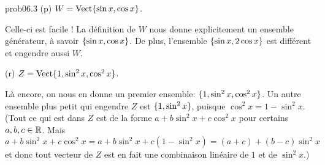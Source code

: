 \begin{sol}{prob06.3}
(p) $W= \sp{\sin x, \cos x}$.

\soln Celle-ci est facile ! La définition de $W$ nous donne explicitement un ensemble gén\'erateur, à savoir $\set{\sin x, \cos x}$. De plus, l'ensemble $\set{\sin x, 2\cos x}$ est différent et engendre aussi $W$.   \medskip

(r)  $ Z=\sp{1, \sin^2 x, \cos^2 x}$.   

\soln   Là encore, on nous en donne un premier ensemble: $\set{1, \sin^2 x, \cos^2 x}$. Un autre ensemble plus petit qui engendre $Z$ est $\set{1, \sin^2 x}$, puisque $\cos^2 x =1-\sin^2 x$. (Tout ce qui est dans $Z$ est de la forme $a+ b\sin^2x + c \cos^2x$ pour certains $a,b,c\in \R$. Mais $a+ b\sin^2x + c \cos^2x= a+ b\sin^2x + c (1-\sin^2 x)= (a+c) + (b-c)\sin^2x$ et donc tout vecteur de $Z$ est en fait une combinaison linéaire de $1$ et de $\sin^2x$.)\medskip

\end{sol}

